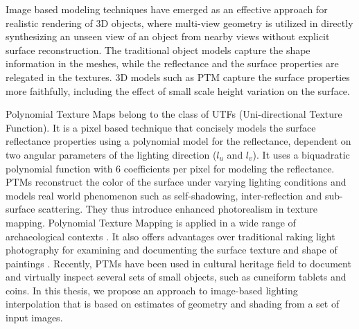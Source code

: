 
Image based modeling techniques \cite{C8,C6,C7} have emerged as
an effective approach for realistic rendering of 3D objects,
where multi-view geometry is utilized in directly synthesizing 
an unseen view of an object from nearby views without
explicit surface reconstruction. The traditional object models capture the shape information in the meshes,
while the reflectance and the surface properties are relegated in the textures. 3D models such as PTM capture the 
surface properties more faithfully, including the effect of small scale height variation on the surface.

Polynomial Texture Maps \cite{C4} belong to the class of UTFs (Uni-directional Texture Function). It is a pixel
based technique that concisely models the surface reflectance properties using a
polynomial model for the reflectance, dependent on two angular parameters of the
lighting direction ($l_u$ and $l_v$). It uses a
biquadratic polynomial function with 6 coefficients per pixel for modeling the
reflectance. PTMs reconstruct the color of the surface under varying
lighting conditions and models real world phenomenon such as
self-shadowing, inter-reflection and sub-surface scattering. They thus introduce
enhanced photorealism in texture mapping.
Polynomial Texture Mapping is applied in a wide
range of archaeological contexts \cite{C14}. 
It also offers advantages over traditional raking
light photography for examining and
documenting the surface texture and
shape of paintings \cite{C13}.
Recently, PTMs have been used in cultural heritage field to document and virtually inspect 
several sets of small objects, such as cuneiform tablets and coins.
In this thesis, 
we propose an approach to image-based lighting interpolation that is
based on estimates of geometry and shading from a set of input images.


